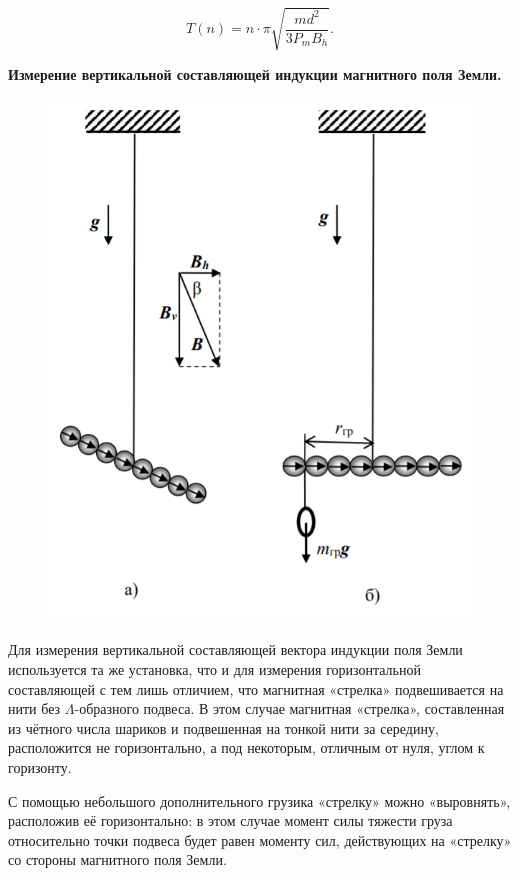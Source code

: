 \documentclass[a4paper,12pt]{article} %
\begin{document}
\begin{equation*}
	T(n) = n \cdot \pi\sqrt{\frac{md^2}{3P_mB_h}}.
\end{equation*}
\vspace{20mm}

\textbf{Измерение вертикальной составляющей индукции магнитного поля Земли.}

\begin{figure}[h!]
	\centering
	\includegraphics[scale=0.7]{Pictures/Вер.png}
\end{figure}

Для измерения вертикальной составляющей вектора индукции поля Земли используется та же установка, что и для измерения горизонтальной составляющей с тем лишь отличием, что магнитная «стрелка» подвешивается на нити без $\Lambda$-образного подвеса. В этом случае магнитная «стрелка», составленная из чётного числа шариков и подвешенная на тонкой нити за середину, расположится не горизонтально, а под некоторым, отличным от нуля, углом к горизонту.

С помощью небольшого дополнительного грузика «стрелку» можно «выровнять», расположив её горизонтально: в этом случае момент силы тяжести груза относительно точки подвеса будет равен моменту сил, действующих на «стрелку» со стороны магнитного поля Земли.
\vspace{15mm}
\end{document}

